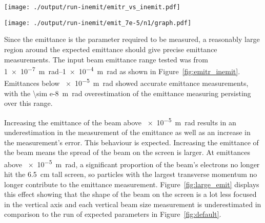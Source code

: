 \begin{figure*}[!htbp]
	\begin{minipage}[t]{\columnwidth}
		\centering
		\texttt{[image: ./output/run-inemit/emitr\_vs\_inemit.pdf]}
		\caption{
			Plot of the ratio between the measured and true emittances of the beam
			against the true emittance of the beam.
			The blue line is the expected measurement value when taking into account
			the systematic overestimation due to discrete bins.
		}
		\label{fig:emitr_inemit}
	\end{minipage}\hfill
	\begin{minipage}[t]{\columnwidth}
		\centering
		\texttt{[image: ./output/run-inemit/emit\_7e-5/n1/graph.pdf]}
		\caption{
			Beam reconstruction for a large beam emittance of
			\SI{7e-5}{\meter\radian} showing the underestimation of the measured
			vertical beam sizes.
		}
		\label{fig:large_emit}
	\end{minipage}
\end{figure*}

Since the emittance is the parameter required to be measured, a reasonably large
region around the expected emittance should give precise emittance measurements.
The input beam emittance range tested was from \SIrange{1e-7}{1e-4}%
{\meter\radian} as shown in Figure~\ref{fig:emitr_inemit}. Emittances below
\SI{e-5}{\meter\radian} showed accurate emittance measurements, with the
\SI{\sim e-8}{\meter\radian} overestimation of the emittance measuring
persisting over this range.

Increasing the emittance of the beam above \SI{e-5}{\meter\radian} results in an
underestimation in the measurement of the emittance as well as an increase in
the measurement's error. This behaviour is expected. Increasing the emittance of
the beam means the spread of the beam on the screen is larger. At emittances
above \SI{e-5}{\meter\radian}, a significant proportion of the beam's electrons
no longer hit the \SI{6.5}{\centi\meter} tall screen, so particles with the
largest transverse momentum no longer contribute to the emittance measurement.
Figure~\ref{fig:large_emit} displays this effect showing that the shape of the
beam on the screen is a lot less focused in the vertical axis and each vertical
beam size measurement is underestimated in comparison to the run of expected
parameters in Figure~\ref{fig:default}.

